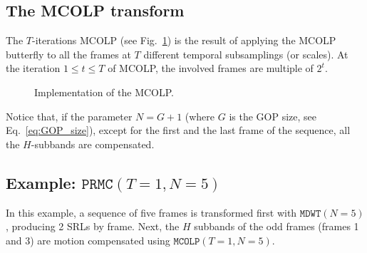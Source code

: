 

\subsection{The MCOLP transform}

The $T$-iterations MCOLP (see Fig.~\ref{fig:MCOLP}) is the result of
applying the MCOLP butterfly to all the frames at $T$ different
temporal subsamplings (or scales). At the iteration $1\leq t\leq T$ of
MCOLP, the involved frames are multiple of $2^t$.

\begin{figure}
  \centering
  
  \caption{Implementation of the MCOLP.}
  \label{fig:MCOLP}
\end{figure}

Notice that, if the parameter $N=G+1$ (where $G$ is the GOP size, see
Eq.~\ref{eq:GOP_size}), except for the first and the last frame of the
sequence, all the $H$-subbands are compensated.


\subsection*{Example: $\mathtt{PRMC}(T=1, N=5)$}

In this example, a sequence of five frames is transformed first with
$\mathtt{MDWT}(N=5)$, producing 2 SRLs by frame. Next, the $H$
subbands of the odd frames (frames 1 and 3) are motion compensated
using $\mathtt{MCOLP}(T=1, N=5)$.

